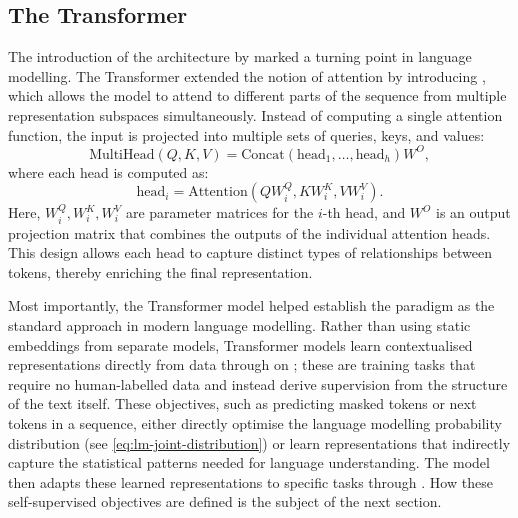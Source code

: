\subsection{The Transformer}
The introduction of the  architecture by \citet{vaswani2017attention} marked a turning point in language modelling. The Transformer extended the notion of attention by introducing , which allows the model to attend to different parts of the sequence from multiple representation subspaces simultaneously. Instead of computing a single attention function, the input is projected into multiple sets of queries, keys, and values:
\begin{equation}
\text{MultiHead}(Q, K, V) = \text{Concat}(\text{head}_1, \dots, \text{head}_h)W^O,
\end{equation}
where each head is computed as:
\begin{equation}
\text{head}_i = \text{Attention}(QW_i^Q, KW_i^K, VW_i^V).
\end{equation}
Here, $W_i^Q, W_i^K, W_i^V$ are parameter matrices for the $i$-th head, and $W^O$ is an output projection matrix that combines the outputs of the individual attention heads. This design allows each head to capture distinct types of relationships between tokens, thereby enriching the final representation.

Most importantly, the Transformer model helped establish the  paradigm as the standard approach in modern language modelling. Rather than using static embeddings from separate models, Transformer models learn contextualised representations directly from data through  on ; these are training tasks that require no human-labelled data and instead derive supervision from the structure of the text itself. These objectives, such as predicting masked tokens or next tokens in a sequence, either directly optimise the language modelling probability distribution (see \cref{eq:lm-joint-distribution}) or learn representations that indirectly capture the statistical patterns needed for language understanding. The model then adapts these learned representations to specific tasks through . How these self-supervised objectives are defined is the subject of the next section.



